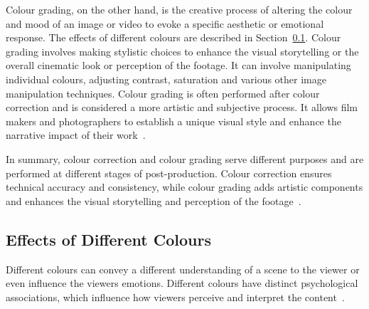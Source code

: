 \documentclass[../MasterThesis.tex]{subfiles}
\begin{document}
Colour grading, on the other hand, is the creative process of altering the colour and mood of an image or video to evoke a specific aesthetic or emotional response. The effects of different colours are described in Section~\ref{subsection:effectsofdifferentcolours}.
Colour grading involves making stylistic choices to enhance the visual storytelling or the overall cinematic look or perception of the footage. It can involve manipulating individual colours, adjusting contrast, saturation and various other image manipulation techniques. Colour grading is often performed after colour correction and is considered a more artistic and subjective process. It allows film makers and photographers to establish a unique visual style and enhance the narrative impact of their work~\cite{cc_cg_1, cc_cg_2}.


In summary, colour correction and colour grading serve different purposes and are performed at different stages of post-production. Colour correction ensures technical accuracy and consistency, while colour grading adds artistic components and enhances the visual storytelling and perception of the footage~\cite{cc1, cc_cg_1, cc_cg_2}.


















\newpage
\subsection{Effects of Different Colours} 
\label{subsection:effectsofdifferentcolours}

Different colours can convey a different understanding of a scene to the viewer or even influence the viewers emotions. 
Different colours have distinct psychological associations, which influence how viewers perceive and interpret the content~\cite{colour,colour2}.
\end{document}
